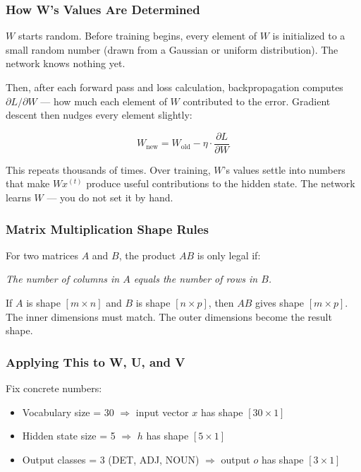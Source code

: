 \subsubsection{How W's Values Are Determined}

$W$ starts random. Before training begins, every element of $W$ is initialized to a small random number (drawn from a Gaussian or uniform distribution). The network knows nothing yet.

Then, after each forward pass and loss calculation, backpropagation computes $\partial L / \partial W$ --- how much each element of $W$ contributed to the error. Gradient descent then nudges every element slightly:

\[
W_{\text{new}} = W_{\text{old}} - \eta \cdot \frac{\partial L}{\partial W}
\]

This repeats thousands of times. Over training, $W$'s values settle into numbers that make $W x^{(t)}$ produce useful contributions to the hidden state. The network learns $W$ --- you do not set it by hand.

\subsubsection{Matrix Multiplication Shape Rules}

For two matrices $A$ and $B$, the product $AB$ is only legal if:

\begin{center}
\textit{The number of columns in $A$ equals the number of rows in $B$.}
\end{center}

If $A$ is shape $[m \times n]$ and $B$ is shape $[n \times p]$, then $AB$ gives shape $[m \times p]$. The inner dimensions must match. The outer dimensions become the result shape.

\subsubsection{Applying This to W, U, and V}

Fix concrete numbers:
\begin{itemize}
    \item Vocabulary size = 30 $\Rightarrow$ input vector $x$ has shape $[30 \times 1]$
    \item Hidden state size = 5 $\Rightarrow$ $h$ has shape $[5 \times 1]$
    \item Output classes = 3 (DET, ADJ, NOUN) $\Rightarrow$ output $o$ has shape $[3 \times 1]$
\end{itemize}

